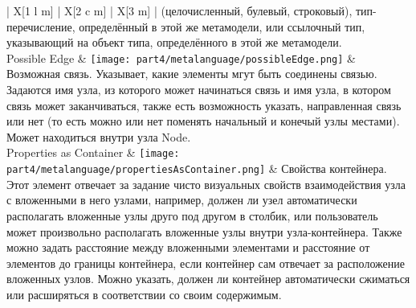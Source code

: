 \begin{center}
\begin{longtabu} {| X[1 l m] | X[2 c m] | X[3 m] |}
		                                                                                                                (целочисленный, булевый, строковый), тип-перечисление, определённый в этой же
		                                                                                                                метамодели, или ссылочный тип, указывающий на объект типа, определённого в этой же метамодели. \\
		Possible Edge               & \texttt{[image: part4/metalanguage/possibleEdge.png]}                & Возможная связь. Указывает, какие элементы мгут быть соединены связью. Задаются имя 
		                                                                                                                узла, из которого может начинаться связь и имя узла, в котором связь может заканчиваться, 
		                                                                                                                также есть возможность указать, направленная связь или нет (то есть можно или нет поменять 
		                                                                                                                начальный и конечый узлы местами). Может находиться внутри узла Node. \\
		Properties as Container     & \texttt{[image: part4/metalanguage/propertiesAsContainer.png]}       & Свойства контейнера. Этот элемент отвечает за задание чисто визуальных свойств 
		                                                                                                                взаимодействия узла с вложенными в него узлами, например, должен ли узел  
		                                                                                                                автоматически располагать вложенные узлы друго под другом в столбик, или пользователь 
		                                                                                                                может произвольно располагать вложенные узлы внутри узла-контейнера. Также можно задать 
		                                                                                                                расстояние между вложенными элементами и расстояние от элементов до границы 
		                                                                                                                контейнера, если контейнер сам отвечает за расположение вложенных узлов. Можно указать, 
		                                                                                                                должен ли контейнер автоматически сжиматься или расширяться в соответствии со своим содержимым. \\

\end{longtabu}
\end{center}

